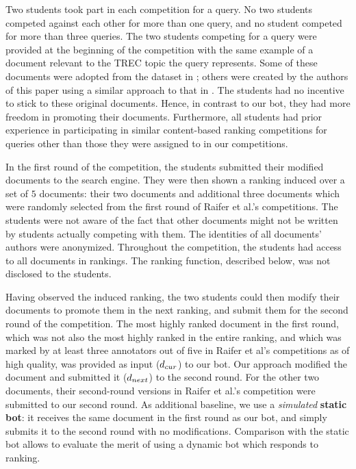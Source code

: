   Two students took part in each competition for a query. No two students competed against each other for more than
  one query, and no student competed for more than three queries.  The
  two students competing for a query were provided at the beginning of
  the competition with the same example of a document relevant to the
  TREC topic the query represents.  Some of these documents were
  adopted from the dataset in \citet{Raifer+al:17a}; others were
  created by the authors of this paper using a similar approach to
  that in \citet{Raifer+al:17a}. The students had no incentive to
  stick to these original documents. Hence, in contrast to our bot,
  they had more freedom in promoting their documents. Furthermore, all
  students had prior experience in participating in similar content-based ranking
  competitions for queries other than those they
  were assigned to in our competitions.

  In the first round of the competition, the students submitted their
  modified documents to the search engine. They were then shown a
  ranking induced over a set of $5$ documents: their two documents and
  additional three 
  \firstmention{\planted} documents which were
    randomly selected
    from the first round of
    Raifer et al.'s competitions.
  The students were not aware of the
  fact that other documents might not be written by students actually
  competing with them. The identities of
  all documents' authors were anonymized. Throughout the competition,
  the students had access to all documents in rankings.
  The ranking function, described below, was not disclosed to the students.
  
  Having observed the induced ranking, the two students could then
  modify their documents to promote them in the next ranking, and
  submit them for the second round of the competition. The most
  highly ranked \planted document in the first round, which was not
  also the most highly ranked in the entire ranking, and which was
  marked by at least three annotators out of five in Raifer et al's
  competitions as of high quality, was provided
  as input ($d_{cur}$) to our bot. Our approach modified the document
  and submitted it ($d_{next}$) to the second round.
  For the other two
  \planted documents, their second-round versions in Raifer et al.'s
  competition were submitted to our second round. As additional baseline, we use a {\em
  simulated} {\bf static bot}: it receives the same
document in the first round as our bot, and simply submits it to the second round with no
modifications. Comparison with the static bot allows to evaluate
the merit of using a dynamic bot which responds to ranking.

